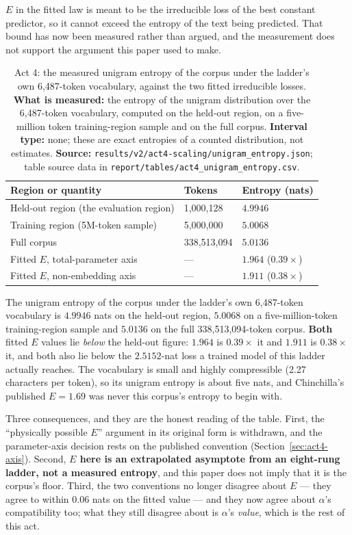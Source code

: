 \documentclass[11pt,a4paper]{article}
\begin{document}
$E$ in the fitted law is meant to be the irreducible loss of the best constant
predictor, so it cannot exceed the entropy of the text being predicted. That
bound has now been measured rather than argued, and the measurement does not
support the argument this paper used to make. %

\begin{table}[H]
\centering
\begin{tabular}{L{6.4cm}R{3.0cm}R{3.2cm}}
\toprule
Region or quantity & Tokens & Entropy (nats) \\
\midrule
Held-out region (the evaluation region) & 1,000,128 & $4.9946$ \\
Training region (5M-token sample) & 5,000,000 & $5.0068$ \\
Full corpus & 338,513,094 & $5.0136$ \\
\midrule
Fitted $E$, total-parameter axis & --- & $1.964$ ($0.39\times$) \\
Fitted $E$, non-embedding axis & --- & $1.911$ ($0.38\times$) \\
\bottomrule
\end{tabular}
\caption{Act 4: the measured unigram entropy of the corpus under the ladder's
own 6,487-token vocabulary, against the two fitted irreducible losses.
\textbf{What is measured:} the entropy of the unigram distribution over the
6,487-token vocabulary, computed on the held-out region, on a five-million
token training-region sample and on the full corpus. \textbf{Interval type:}
none; these are exact entropies of a counted distribution, not estimates.
\textbf{Source:} \texttt{results/v2/act4-scaling/unigram\_entropy.json};
table source data in
\texttt{report/tables/act4\_unigram\_entropy.csv}.}
\label{tab:act4-entropy}
\end{table}

The unigram entropy of the corpus under the ladder's own 6,487-token
vocabulary is $4.9946$ nats on the held-out region, $5.0068$ on a
five-million-token training-region sample and $5.0136$ on the full
338,513,094-token corpus. \textbf{Both} fitted $E$ values lie \emph{below}
the held-out figure: $1.964$ is $0.39\times$ it and $1.911$ is $0.38\times$
it, and both also lie below the $2.5152$-nat loss a trained model of this
ladder actually reaches. The vocabulary is small and highly compressible (2.27
characters per token), so its unigram entropy is about five nats, and
Chinchilla's published $E = 1.69$ was never this corpus's entropy to begin
with.

Three consequences, and they are the honest reading of the table. First, the
``physically possible $E$'' argument in its original form is withdrawn, and the
parameter-axis decision rests on the published convention
(Section~\ref{sec:act4-axis}). Second, \textbf{$E$ here is an extrapolated
asymptote from an eight-rung ladder, not a measured entropy}, and this paper
does not imply that it is the corpus's floor. Third, the two conventions no
longer disagree about $E$ --- they agree to within $0.06$ nats on the fitted
value --- and they now agree about
$\alpha$'s compatibility too; what they still disagree about is $\alpha$'s
\emph{value}, which is the rest of this act. %
\end{document}
